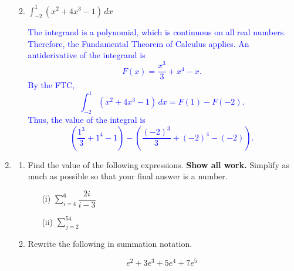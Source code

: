 \documentclass[11pt]{article}
\begin{document}
\begin{enumerate}
\begin{enumerate}
\vfill

\item $\displaystyle \int_{-2}^{1} \left(x^2 + 4x^3 - 1\right)\,dx$

\vfill

\textcolor{blue}{
The integrand is a polynomial, which is continuous on all real numbers. Therefore, the Fundamental Theorem of Calculus applies.
An antiderivative of the integrand is
\[
F(x) = \frac{x^3}{3} + x^4 - x.
\]
By the FTC,
\[
\int_{-2}^{1} \left(x^2 + 4x^3 - 1\right)\,dx
= F(1) - F(-2).
\]
Thus, the value of the integral is
\[
\left(\frac{1^3}{3} + 1^4 - 1\right)
-
\left(\frac{(-2)^3}{3} + (-2)^4 - (-2)\right).
\]
}
\vfill
\end{enumerate}


\newpage


\item \begin{enumerate}
    \item Find the value of the following expressions. \textbf{Show all work.} Simplify as much as possible so that your final answer is a number.

    \begin{enumerate}
        \item[(i)] $\displaystyle\sum_{i=4}^6\dfrac{2i}{i-3}$

        \vfill

        \item[(ii)] $\displaystyle\sum_{j=2}^54$ 

        \vfill
    \end{enumerate}

    \item Rewrite the following in summation notation. 

    \[e^2+3e^3+5e^4+7e^5\]

    \vfill
\end{enumerate}


\newpage


\end{enumerate}
\end{document}
